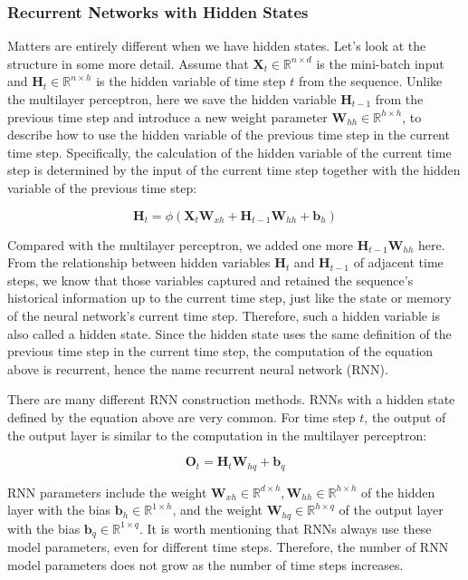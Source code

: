 \subsubsection{Recurrent Networks with Hidden States}\label{subsubsec:rnn_with_hidden_state}

Matters are entirely different when we have hidden states. Let's look at the structure in some more detail. Assume that $\mathbf{X}_t \in \mathbb{R}^{n \times d}$ is the mini-batch input and $\mathbf{H}_t  \in \mathbb{R}^{n \times h}$ is the hidden variable of time step $t$ from the sequence.  Unlike the multilayer perceptron, here we save the hidden variable $\mathbf{H}_{t-1}$ from the previous time step and introduce a new weight parameter $\mathbf{W}_{hh} \in \mathbb{R}^{h \times h}$, to describe how to use the hidden variable of the previous time step in the current time step. Specifically, the calculation of the hidden variable of the current time step is determined by the input of the current time step together with the hidden variable of the previous time step:

$$\mathbf{H}_t = \phi(\mathbf{X}_t \mathbf{W}_{xh} + \mathbf{H}_{t-1} \mathbf{W}_{hh}  + \mathbf{b}_h)$$

Compared with the multilayer perceptron, we added one more $\mathbf{H}_{t-1} \mathbf{W}_{hh}$ here. From the relationship between hidden variables $\mathbf{H}_t$ and $\mathbf{H}_{t-1}$ of adjacent time steps, we know that those variables captured and retained the sequence's historical information up to the current time step, just like the state or memory of the neural network's current time step. Therefore, such a hidden variable is also called a hidden state. Since the hidden state uses the same definition of the previous time step in the current time step, the computation of the equation above is recurrent, hence the name recurrent neural network (RNN).

There are many different RNN construction methods.  RNNs with a hidden state defined by the equation above are very common. For time step $t$, the output of the output layer is similar to the computation in the multilayer perceptron:

$$\mathbf{O}_t = \mathbf{H}_t \mathbf{W}_{hq} + \mathbf{b}_q$$

RNN parameters include the weight $\mathbf{W}_{xh} \in \mathbb{R}^{d \times h}, \mathbf{W}_{hh} \in \mathbb{R}^{h \times h}$ of the hidden layer with the bias $\mathbf{b}_h \in \mathbb{R}^{1 \times h}$, and the weight $\mathbf{W}_{hq} \in \mathbb{R}^{h \times q}$ of the output layer with the bias $\mathbf{b}_q \in \mathbb{R}^{1 \times q}$. It is worth mentioning that RNNs always use these model parameters, even for different time steps. Therefore, the number of RNN model parameters does not grow as the number of time steps increases.

